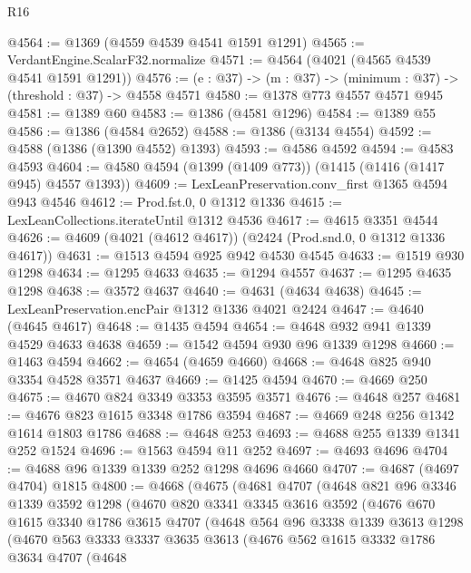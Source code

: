 \begin{lexlean}{R16}
\begin{coremodule}
@4564 := @1369 (@4559 @4539 @4541 @1591 @1291)
@4565 := VerdantEngine.ScalarF32.normalize
@4571 := @4564 (@4021 (@4565 @4539 @4541 @1591 @1291))
@4576 := (e : @37) -> (m : @37) -> (minimum : @37) -> (threshold : @37) -> @4558 @4571
@4580 := @1378 @773 @4557 @4571 @945
@4581 := @1389 @60
@4583 := @1386 (@4581 @1296)
@4584 := @1389 @55
@4586 := @1386 (@4584 @2652)
@4588 := @1386 (@3134 @4554)
@4592 := @4588 (@1386 (@1390 @4552) @1393)
@4593 := @4586 @4592
@4594 := @4583 @4593
@4604 := @4580 @4594 (@1399 (@1409 @773)) (@1415 (@1416 (@1417 @945) @4557 @1393))
@4609 := LexLeanPreservation.conv_first @1365 @4594 @943 @4546
@4612 := Prod.fst.{0, 0} @1312 @1336
@4615 := LexLeanCollections.iterateUntil @1312 @4536
@4617 := @4615 @3351 @4544
@4626 := @4609 (@4021 (@4612 @4617)) (@2424 (Prod.snd.{0, 0} @1312 @1336 @4617))
@4631 := @1513 @4594 @925 @942 @4530 @4545
@4633 := @1519 @930 @1298
@4634 := @1295 @4633
@4635 := @1294 @4557
@4637 := @1295 @4635 @1298
@4638 := @3572 @4637
@4640 := @4631 (@4634 @4638)
@4645 := LexLeanPreservation.encPair @1312 @1336 @4021 @2424
@4647 := @4640 (@4645 @4617)
@4648 := @1435 @4594
@4654 := @4648 @932 @941 @1339 @4529 @4633 @4638
@4659 := @1542 @4594 @930 @96 @1339 @1298
@4660 := @1463 @4594
@4662 := @4654 (@4659 @4660)
@4668 := @4648 @825 @940 @3354 @4528 @3571 @4637
@4669 := @1425 @4594
@4670 := @4669 @250
@4675 := @4670 @824 @3349 @3353 @3595 @3571
@4676 := @4648 @257
@4681 := @4676 @823 @1615 @3348 @1786 @3594
@4687 := @4669 @248 @256 @1342 @1614 @1803 @1786
@4688 := @4648 @253
@4693 := @4688 @255 @1339 @1341 @252 @1524
@4696 := @1563 @4594 @11 @252
@4697 := @4693 @4696
@4704 := @4688 @96 @1339 @1339 @252 @1298 @4696 @4660
@4707 := @4687 (@4697 @4704) @1815
@4800 := @4668
    (@4675
      (@4681
        @4707
        (@4648
          @821
          @96
          @3346
          @1339
          @3592
          @1298
          (@4670
            @820
            @3341
            @3345
            @3616
            @3592
            (@4676
              @670
              @1615
              @3340
              @1786
              @3615
              @4707
              (@4648
                @564
                @96
                @3338
                @1339
                @3613
                @1298
                (@4670
                  @563
                  @3333
                  @3337
                  @3635
                  @3613
                  (@4676
                    @562
                    @1615
                    @3332
                    @1786
                    @3634
                    @4707
                    (@4648

\end{coremodule}
\end{lexlean}

